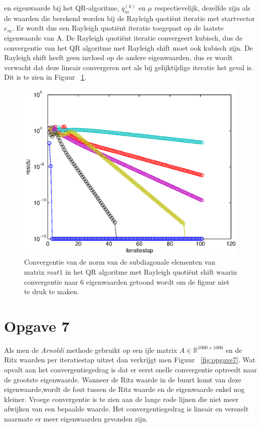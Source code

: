\documentclass[a4paper]{article}
\newcommand{\opgave}[1]{\section*{Opgave #1}}
\begin{document}
en eigenwaarde bij het QR-algoritme, $q_m^{(k)}$ en $\mu$ respectievelijk, dezelfde zijn als de waarden
die berekend worden bij de Rayleigh quoti\"{e}nt iteratie met startvector $e_m$. Er wordt dus een Rayleigh quoti\"{e}nt iteratie toegepast op de laatste eigenwaarde van
A. De Rayleigh quoti\"{e}nt iteratie convergeert kubisch, dus de convergentie van het QR algoritme met Rayleigh shift moet ook kubisch zijn. De Rayleigh shift heeft geen invloed op de andere eigenwaarden, dus er wordt verwacht dat deze lineair convergeren net als bij gelijktijdige iteratie het geval is. Dit is te zien in Figuur ~\ref{fig:opgave6}.
\begin{figure}
\centerline{\includegraphics{pictures/opgave6Beter.eps}}
\caption{Convergentie van de norm van de subdiagonale elementen van matrix $mat1$ in het QR algoritme met Rayleigh quoti\"{e}nt shift waarin convergentie naar 6 eigenwaarden getoond wordt om de figuur niet te druk te maken.}
\label{fig:opgave6}
\end{figure}
\opgave{7}
Als men de \textit{Arnoldi} methode gebruikt op een ijle matrix $A \in \mathbb{R}^{1000\times1000}$ en de Ritz waarden per iteratiestap uitzet dan verkrijgt men Figuur ~\ref{fig:opgave7}.
Wat opvalt aan het convergentiegedrag is dat er eerst snelle convergentie optreedt naar de grootste eigenwaarde. Wanneer de Ritz waarde in de buurt komt van deze eigenwaarde,wordt de fout tussen de Ritz waarde en de eigenwaarde enkel nog kleiner. Vroege convergentie is te zien aan de lange rode lijnen die niet meer afwijken van een bepaalde waarde. Het convergentiegedrag is lineair en versnelt naarmate er meer eigenwaarden gevonden zijn.
\end{document}
